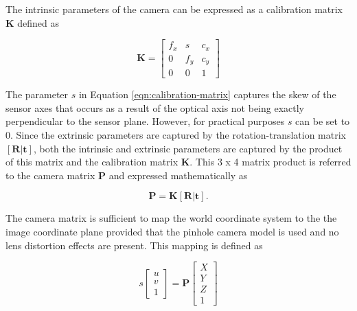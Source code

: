 The intrinsic parameters of the camera can be expressed as a calibration matrix $\textbf{K}$ defined as

\begin{equation}
	\textbf{K}=
	\begin{bmatrix}
		f_x & s & c_x \\ 
		0 & f_y & c_y \\ 
		0 & 0 & 1
	\end{bmatrix}
	\label{eqn:calibration-matrix}
\end{equation}

The parameter $s$ in Equation \ref{eqn:calibration-matrix} captures the skew of the sensor axes that occurs as a result of the optical axis not being exactly perpendicular to the sensor plane. However, for practical purposes $s$ can be set to 0. Since the extrinsic parameters are captured by the rotation-translation matrix $[\textbf{R}|\textbf{t}]$, both the intrinsic and extrinsic parameters are captured by the product of this matrix and the calibration matrix $\textbf{K}$. This 3 x 4 matrix product is referred to the camera matrix $\textbf{P}$ and expressed mathematically as

\begin{equation}
	\textbf{P}=\textbf{K}[\textbf{R}|\textbf{t}].
	\label{eqn:camera-matrix}
\end{equation}

The camera matrix is sufficient to map the world coordinate system to the the image coordinate plane provided that the pinhole camera model is used and no lens distortion effects are present. This mapping is defined as

\begin{equation}
	s
	\begin{bmatrix}
		u \\ 
		v \\ 
		1
	\end{bmatrix}
	=
	\textbf{P}
	\begin{bmatrix}
		X \\ 
		Y \\ 
		Z \\
		1
	\end{bmatrix}
	\label{eqn:pinhole-camera-mapping}
\end{equation}

